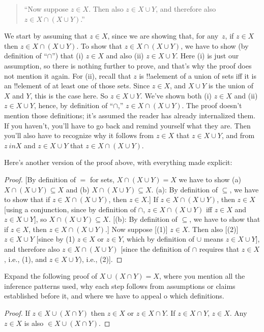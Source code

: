 \documentclass[../../../include/open-logic-section]{subfiles}
\begin{document}
\begin{quote}
``Now suppose $z \in X$. Then also $z \in X \cup Y$, and
therefore also $z \in X \cap (X \cup Y)$.''
\end{quote}

We start by assuming that $z \in X$, since we are showing that, for
any~$z$, if $z \in X$ then $z \in X \cap (X \cup Y)$.  To show that $z
\in X \cap (X \cup Y)$, we have to show (by definition of ``$\cap$'')
that (i) $z \in X$ and also (ii) $z \in X \cup Y$. Here (i) is just
our assumption, so there is nothing further to prove, and that's why
the proof does not mention it again. For (ii), recall that $z$ is
!!a{element} of a union of sets iff it is an !!{element} of at least
one of those sets. Since $z \in X$, and $X \cup Y$ is the union of $X$
and $Y$, this is the case here. So $z \in X \cup Y$. We've shown both
(i) $z \in X$ and (ii) $z \in X \cup Y$, hence, by definition of
``$\cap$,'' $z \in X \cap (X \cup Y)$.  The proof doesn't mention
those definitions; it's assumed the reader has already internalized
them.  If you haven't, you'll have to go back and remind yourself what
they are. Then you'll also have to recognize why it follows from $z
\in X$ that $z \in X \cup Y$, and from $z \ in X$ and $z \in X \cup Y$
that $z \in X \cap (X \cup Y)$.

Here's another version of the proof above, with everything made
explicit:
\begin{proof}{}
[By definition of $=$ for sets, $X \cap (X \cup Y) = X$ we have to
  show (a) $X \cap (X \cup Y) \subseteq X$ and (b) $X \cap (X \cup Y)
  \subseteq X$. (a): By definition of $\subseteq$, we have to show
  that if $z \in X \cap (X \cup Y)$, then $z \in X$.]  If $z \in X
\cap (X \cup Y)$, then $z \in X$ [using a conjunction, since by
  definition of $\cap$, $z \in X \cap (X \cup Y)$ iff $z \in X$ and $z
  \in X \cup Y$], so $X \cap (X \cup Y) \subseteq X$. [(b): By
  definition of $\subseteq$, we have to show that if $z \in X$, then
  $z \in X \cap (X \cup Y)$.] Now suppose [(1)] $z \in X$. Then also
     [(2)] $z \in X \cup Y$ [since by (1) $z \in X$ or $z \in Y$,
       which by definition of $\cup$ means $z \in X \cup Y$], and
     therefore also $z \in X \cap (X \cup Y)$ [since the definition of
       $\cap$ requires that $z \in X$, i.e., (1), and $z \in X \cup
       Y)$, i.e., (2)].
\end{proof}

\begin{prob}
Expand the following proof of $X \cup (X \cap Y) = X$, where you
mention all the inference patterns used, why each step follows from
assumptions or claims established before it, and where we have to
appeal o which definitions.
\begin{proof}
  If $z \in X \cup (X \cap Y)$ then $z \in X$ or $z \in X \cap Y$. If
  $z \in X \cap Y$, $z \in X$. Any $z \in X$ is also $\in X \cup (X
  \cap Y)$.
\end{proof}
\end{prob}
\end{document}
